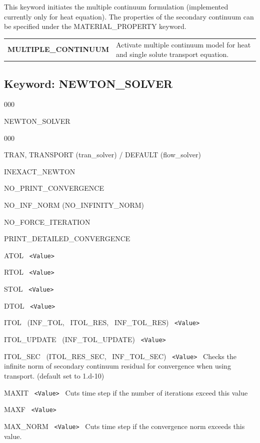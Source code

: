 \hfill\hyperlink{target_key}{\return}

This keyword initiates the multiple continuum formulation (implemented currently only for heat equation). The properties of the secondary continuum can be
specified under the MATERIAL\_PROPERTY keyword.

\begin{tabularx}{\linewidth}{lX}
\bf MULTIPLE\_CONTINUUM & Activate multiple continuum model for heat and single solute transport equation. 
\end{tabularx}

\hyperlink{target_key}{\return}


\newpage
\protect\hypertarget{target_newt}{}

\subsection{Keyword: NEWTON\_SOLVER}

\hfill\hyperlink{target_key}{\return}


\begin{deflist}{000}
\item[NEWTON\_SOLVER] ~
\begin{deflist}{000}
\item[TRAN, TRANSPORT (tran\_solver) / DEFAULT (flow\_solver)]
\item[INEXACT\_NEWTON]
\item[NO\_PRINT\_CONVERGENCE]
\item[NO\_INF\_NORM (NO\_INFINITY\_NORM)]
\item[NO\_FORCE\_ITERATION]
\item[PRINT\_DETAILED\_CONVERGENCE]
\item[ATOL] \ {\tt <Value>}
\item[RTOL] \ {\tt <Value>}
\item[STOL] \ {\tt <Value>}
\item[DTOL] \ {\tt <Value>}
\item[ITOL \ (INF\_TOL, \ ITOL\_RES, \ INF\_TOL\_RES)] \ {\tt <Value>}
\item[ITOL\_UPDATE \ (INF\_TOL\_UPDATE)] \ {\tt <Value>}
\item[ITOL\_SEC \ (ITOL\_RES\_SEC, \ INF\_TOL\_SEC)] \ {\tt <Value>} \ Checks the infinite norm of secondary continuum residual for convergence when using transport. (default set to 1.d-10)
\item[MAXIT] \ {\tt <Value>} \ Cuts time step if the number of iterations exceed this value
\item[MAXF] \ {\tt <Value>}
\item[MAX\_NORM] \ {\tt <Value>} \ Cuts time step if the convergence norm exceeds this value. 
\end{deflist}
\item[\keyend]
\end{deflist}

